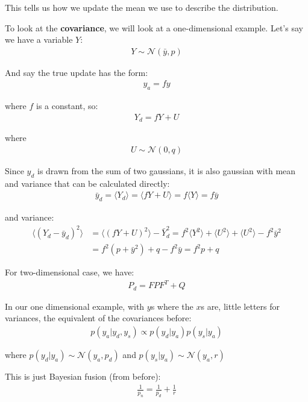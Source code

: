 \documentclass[11pt,a4paper,titlepage,dvipsnames,cmyk]{scrartcl}
\begin{document}
This tells us how we update the mean we use to describe the distribution.

To look at the \textbf{covariance}, we will look at a one-dimensional example. Let's say we have a variable $Y$:
\begin{align*}
Y \sim \mathcal{N}(\bar y, p)
\end{align*}

And say the true update has the form:
\begin{align*}
y_a = fy
\end{align*}

where $f$ is a constant, so:
\begin{align*}
    Y_d = fY + U
\end{align*}

where
\begin{align*}
U \sim \mathcal{N}(0,q)
\end{align*}

Since $y_d$ is drawn from the sum of two gaussians, it is also gaussian with mean and variance that can be calculated directly:
\begin{align*}
\bar y_d = \langle Y_d \rangle = \langle fY + U \rangle = f \langle Y \rangle = f \bar y
\end{align*}

and variance:
\begin{align*}
\langle (Y_d - \bar y_d) ^2 \rangle &= \langle(fY+U)^2\rangle - \bar Y_d^2 = f^2 \langle Y^2 \rangle + \langle U^2 \rangle + \langle U^2 \rangle - f^2 \bar y ^2 \\
&= f^2(p+\bar y^2) + q - f^2 \bar y = f^2p + q
\end{align*}

For two-dimensional case, we have:
\begin{align*}
P_d = FPF^T + Q
\end{align*}

In our one dimensional example, with $y$s where the $x$s are, little letters for variances, the equivalent of the covariances before:
\begin{align*}
p(y_a|y_d,y_s) \varpropto p(y_d | y_a) p(y_s|y_a)
\end{align*}

where $p(y_d|y_a) \sim \mathcal{N}(y_a,p_d)$ and $p(y_s|y_a) \sim \mathcal{N}(y_a,r)$

This is just Bayesian fusion (from before):
\begin{align*}
\frac{1}{p_n} = \frac{1}{p_d} + \frac{1}{r}
\end{align*}
\end{document}
